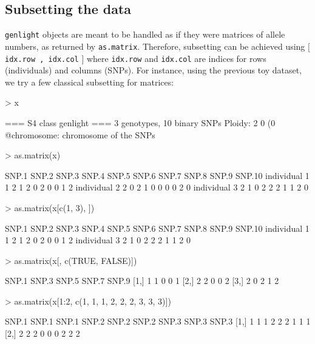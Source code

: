 \documentclass{article}
\begin{document}
\subsection{Subsetting the data}
\texttt{genlight} objects are meant to be handled as if they were matrices of allele numbers, as
returned by \texttt{as.matrix}.
Therefore, subsetting can be achieved using $[$ \texttt{idx.row , idx.col} $]$ where \texttt{idx.row}
and \texttt{idx.col} are indices for rows (individuals) and columns (SNPs).
For instance, using the previous toy dataset, we try a few classical subsetting for matrices:
\begin{Schunk}
\begin{Sinput}
> x
\end{Sinput}
\begin{Soutput}
 === S4 class genlight ===
 3 genotypes,  10 binary SNPs
 Ploidy: 2
 0 (0 %) missing data
 @chromosome: chromosome of the SNPs
\end{Soutput}
\begin{Sinput}
> as.matrix(x)
\end{Sinput}
\begin{Soutput}
             SNP.1 SNP.2 SNP.3 SNP.4 SNP.5 SNP.6 SNP.7 SNP.8 SNP.9 SNP.10
individual 1     1     2     1     2     0     2     0     0     1      2
individual 2     2     0     2     1     0     0     0     0     2      0
individual 3     2     1     0     2     2     2     1     1     2      0
\end{Soutput}
\begin{Sinput}
> as.matrix(x[c(1, 3), ])
\end{Sinput}
\begin{Soutput}
             SNP.1 SNP.2 SNP.3 SNP.4 SNP.5 SNP.6 SNP.7 SNP.8 SNP.9 SNP.10
individual 1     1     2     1     2     0     2     0     0     1      2
individual 3     2     1     0     2     2     2     1     1     2      0
\end{Soutput}
\begin{Sinput}
> as.matrix(x[, c(TRUE, FALSE)])
\end{Sinput}
\begin{Soutput}
     SNP.1 SNP.3 SNP.5 SNP.7 SNP.9
[1,]     1     1     0     0     1
[2,]     2     2     0     0     2
[3,]     2     0     2     1     2
\end{Soutput}
\begin{Sinput}
> as.matrix(x[1:2, c(1, 1, 1, 2, 2, 2, 3, 3, 3)])
\end{Sinput}
\begin{Soutput}
     SNP.1 SNP.1 SNP.1 SNP.2 SNP.2 SNP.2 SNP.3 SNP.3 SNP.3
[1,]     1     1     1     2     2     2     1     1     1
[2,]     2     2     2     0     0     0     2     2     2
\end{Soutput}
\end{Schunk}
\end{document}
